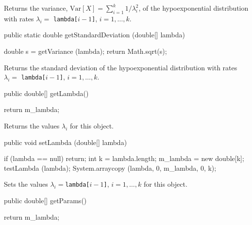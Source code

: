 \begin{tabb}  Returns the variance,
$\mbox{Var}[X] = \sum_{i=1}^k 1/\lambda_i^2$,
of the hypoexponential distribution with rates $\lambda_i = $
\texttt{lambda[$i-1$]}, $i = 1,\ldots,k$.
\end{tabb}
\begin{htmlonly}
\end{htmlonly}
\begin{code}

   public static double getStandardDeviation (double[] lambda)\begin{hide} {
      double s = getVariance (lambda);
      return Math.sqrt(s);
   }\end{hide}
\end{code}
\begin{tabb}  Returns the standard deviation
of the hypoexponential distribution  with rates $\lambda_i = $
\texttt{lambda[$i-1$]}, $i = 1,\ldots,k$.
\end{tabb}
\begin{htmlonly}
\end{htmlonly}
\begin{code}

   public double[] getLambda()\begin{hide} {
      return m_lambda;
   }
\end{hide}
\end{code}
  \begin{tabb}
  Returns the values $\lambda_i$ for this object.
 \end{tabb}
\begin{code}

   public void setLambda (double[] lambda)\begin{hide} {
      if (lambda == null)
         return;
      int k = lambda.length;
      m_lambda = new double[k];
      testLambda (lambda);
      System.arraycopy (lambda, 0, m_lambda, 0, k);
   }\end{hide}
\end{code}
  \begin{tabb}
  Sets the values $\lambda_i = $\texttt{lambda[$i-1$]},
 $i = 1,\ldots,k$ for this object.
 \end{tabb}
\begin{code}

   public double[] getParams()\begin{hide} {
      return m_lambda;
   }\end{hide}
\end{code}

